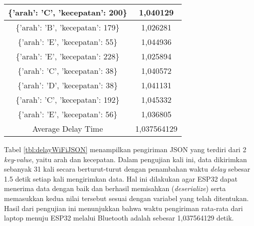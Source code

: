 \begin{table}[!h]
\begin{tabular}{|c|c|}
  \{'arah': 'C', 'kecepatan': 200\} & 1,040129    \\ \hline
  \{'arah': 'B', 'kecepatan': 179\} & 1,026281    \\ \hline
  \{'arah': 'E', 'kecepatan': 55\}  & 1,044936    \\ \hline
  \{'arah': 'E', 'kecepatan': 228\} & 1,025894    \\ \hline
  \{'arah': 'C', 'kecepatan': 38\}  & 1,040572    \\ \hline
  \{'arah': 'D', 'kecepatan': 38\}  & 1,041131    \\ \hline
  \{'arah': 'C', 'kecepatan': 192\} & 1,045332    \\ \hline
  \{'arah': 'E', 'kecepatan': 56\}  & 1,036805    \\ \hline
  Average Delay Time                & 1,037564129 \\ \hline
  \end{tabular}
\end{table}

Tabel \ref{tbl:delayWiFiJSON} menampilkan pengiriman JSON yang terdiri dari 2 \emph{key}-\emph{value}, yaitu arah dan kecepatan. Dalam pengujian kali ini, data dikirimkan sebanyak 31 kali secara berturut-turut dengan penambahan waktu \emph{delay} sebesar 1.5 detik setiap kali mengirimkan data. Hal ini dilakukan agar ESP32 dapat menerima data dengan baik dan berhasil memisahkan (\emph{deserialize}) serta memasukkan kedua nilai tersebut sesuai dengan variabel yang telah ditentukan. Hasil dari pengujian ini menunjukkan bahwa waktu pengiriman rata-rata dari laptop menuju ESP32 melalui Bluetooth adalah sebesar 1,037564129 detik.

